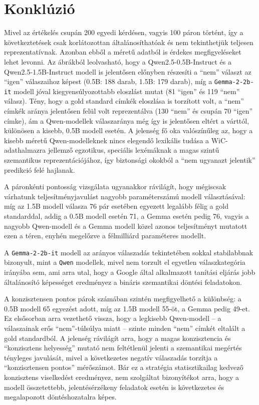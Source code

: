 \documentclass[12pt]{report}
\begin{document}
\chapter{Konklúzió} %
Mivel az értékelés csupán 200 egyedi kérdésen, vagyis 100 páron történt, így a következtetések csak korlátozottan általánosíthatóak és nem tekinthetjük teljesen reprezentatívnak.
Azonban ebből a méretű adatból is érdekes megfigyeléseket lehet levonni. 
Az ábrákból leolvasható, hogy a Qwen2.5-0.5B-Instruct és a Qwen2.5-1.5B-Instruct modell is jelentősen előnyben részesíti a ``nem'' választ az ``igen'' válaszaihoz képest (0.5B: 188 darab, 1.5B: 179 darab), míg a \texttt{\allowbreak Gemma-2-2b-it} 
modell jóval kiegyensúlyozottabb eloszlást mutat (81 ``igen'' és 119 ``nem'' válasz). Tény, hogy a gold standard címkék eloszlása is torzított volt, a ``nem'' címkék aránya jelentősen felül volt reprezentálva (130 ``nem'' és csupán 70 ``igen'' címke), ám a Qwen-modellek válaszaránya még így is jelentősen eltért a várttól, különösen a kisebb, 0.5B modell esetén.
A jelenség fő oka valószínűleg az, hogy a kisebb méretű Qwen-modelleknek nincs elegendő 
lexikális tudása a WiC-adathalmazra jellemző egzotikus, speciális lexémáknak a magas szintű szemantikus 
reprezentációjához, így biztonsági okokból a ``nem ugyanazt jelentik'' predikció felé 
hajlanak.

A páronkénti pontosság vizsgálata ugyanakkor rávilágít, hogy mégiscsak várhatunk teljesítményjavulást nagyobb paraméterszámú modell választásával: míg az 1.5B modell válasza
76 pár esetében egyezett legalább félig a gold standarddal, addig a 0.5B modell esetén 71, a Gemma esetén pedig 76, vagyis a 
nagyobb Qwen-modell és a Gemma modell közel azonos teljesítményt mutatott ezen a téren, enyhén megelőzve a félmilliárd paraméteres modellt.

A \texttt{\allowbreak Gemma-2-2b-it} modell az arányos válaszadás tekintetében sokkal stabilabbnak 
bizonyult, mint a \texttt{\allowbreak Qwen} modellek, mivel nem torzult el egyetlen válaszkategória irányába sem, ami arra 
utal, hogy a Google által alkalmazott tanítási eljárás jobb általánosító képességet 
eredményez a bináris szemantikai döntési feladatokon.

A konzisztensen pontos párok számában szintén megfigyelhető a különbség: 
a 0.5B modell 65 egyezést adott, míg az 1.5B modell 55-öt, a Gemma pedig 49-et. 
Ez elsősorban arra vezethető vissza, hogy a legkisebb Qwen-modell – a válaszainak erős ``nem''-túlsúlya 
miatt – szinte minden ``nem'' címkét eltalált a gold standardból. A jelenség rávilágít arra, hogy a magas konzisztencia és ``konzisztens helyesség'' mutató nem feltétlenül jelenti a szemantikai megértés tényleges 
javulását, mivel a következetes negatív válaszadás torzítja a ``konzisztensen pontos'' mérőszámot. Bár ez a stratégia statisztikailag kedvező konzisztens viselkedést eredményez, nem szolgáltat bizonyítékot arra, hogy a modell összetettebb, jelentésérzékeny feladatok esetén is következetes és megalapozott döntéshozatalra képes.
\end{document}
